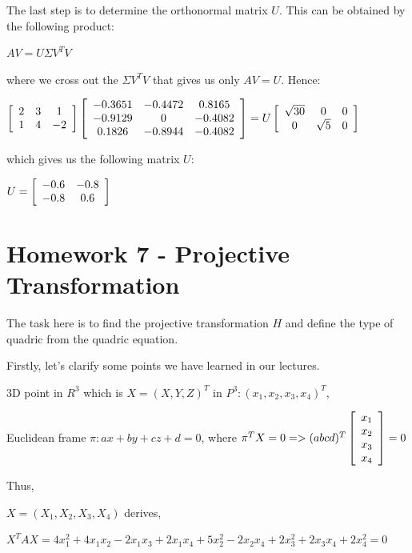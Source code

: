 \documentclass[]{article}
\begin{document}
The last step is to determine the orthonormal matrix $U$. This can be obtained by the following product:

\centerline {
	$AV = U \Sigma V^TV$
} 

where we cross out the $\Sigma V^TV$ that gives us only $AV = U$. Hence:

\centerline{ $\left[ {\begin{array}{*{20}c}
		2 & 3 & 1 \\
		1 & 4 & -2   
		\end{array} } \right] 
			\left[ {\begin{array}{*{20}c}
		-0.3651 & -0.4472 & 0.8165 \\
		-0.9129 & 0 & -0.4082 \\ 
		0.1826 & -0.8944 & -0.4082  
		\end{array} } \right] = U \left[ {\begin{array}{*{20}c}
		\sqrt{30} & 0 & 0 \\
		0 & \sqrt{5} & 0   
		\end{array} } \right]$ 
}

which gives us the following matrix $U$:

\centerline {
	$U = \left[ {\begin{array}{*{20}c}
		-0.6 & -0.8 \\
		-0.8 & 0.6   
		\end{array} } \right]$
}

\section{Homework 7 - Projective Transformation}  
The task here is to find the projective transformation $H$ and define the type of quadric from the quadric equation.

Firstly, let's clarify some points we have learned in our lectures. 

\centerline {
	3D point in $R^3$ which is $X = (X, Y, Z)^T$ in $P^3 : (x_1, x_2, x_3, x_4)^T$,
}

\centerline {
	Euclidean frame $\pi : ax + by + cz +d = 0$, where
	$\pi^TX = 0 => (a b c d) ^T\left[ {\begin{array}{*{20}c}
		x_1 \\
		x_2 \\ 
		x_3 \\
		x_4  
		\end{array} } \right] = 0$	
}

Thus, 

\centerline {
	$X = (X_1, X_2, X_3, X_4)$ derives, 
}
\vspace{0.2em}
\centerline {
		$X^TAX = 4x_1^2 + 4x_1x_2 - 2x_1x_3 + 2x_1x_4 + 5x_2^2 - 2x_2x_4 + 2x_3^2 + 2x_3x_4 + 2x_4^2 = 0$
}
\end{document}

